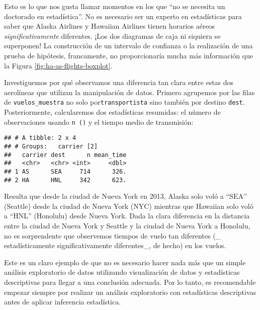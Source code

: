 \documentclass[
]{book}
\newenvironment{Shaded}{\begin{snugshade}}{\end{snugshade}}
\newcommand{\DataTypeTok}[1]{\textcolor[rgb]{0.13,0.29,0.53}{#1}}
\newcommand{\KeywordTok}[1]{\textcolor[rgb]{0.13,0.29,0.53}{\textbf{#1}}}
\newcommand{\NormalTok}[1]{#1}
\newcommand{\OperatorTok}[1]{\textcolor[rgb]{0.81,0.36,0.00}{\textbf{#1}}}
\newcommand{\OtherTok}[1]{\textcolor[rgb]{0.56,0.35,0.01}{#1}}
\newcommand{\StringTok}[1]{\textcolor[rgb]{0.31,0.60,0.02}{#1}}
\begin{document}
Esto es lo que nos gusta llamar momentos en los que ``no se necesita un doctorado en estadística''. No es necesario ser un experto en estadísticas para saber que Alaska Airlines y Hawaiian Airlines tienen horarios aéreos \emph{significativamente} diferentes. ¡Los dos diagramas de caja ni siquiera se superponen! La construcción de un intervalo de confianza o la realización de una prueba de hipótesis, francamente, no proporcionaría mucha más información que la Figura \ref{fig:ha-as-flights-boxplot}.

Investiguemos por qué observamos una diferencia tan clara entre estas dos aerolíneas que utilizan la manipulación de datos. Primero agrupemos por las filas de \texttt{vuelos\_muestra} no solo por\texttt{transportista} sino también por destino \texttt{dest}. Posteriormente, calcularemos dos estadísticas resumidas: el número de observaciones usando \texttt{n\ ()} y el tiempo medio de transmisión:

\begin{Shaded}
\end{Shaded}

\begin{verbatim}
## # A tibble: 2 x 4
## # Groups:   carrier [2]
##   carrier dest      n mean_time
##   <chr>   <chr> <int>     <dbl>
## 1 AS      SEA     714      326.
## 2 HA      HNL     342      623.
\end{verbatim}

Resulta que desde la ciudad de Nueva York en 2013, Alaska solo voló a ``SEA'' (Seattle) desde la ciudad de Nueva York (NYC) mientras que Hawaiian solo voló a ``HNL'' (Honolulu) desde Nueva York. Dada la clara diferencia en la distancia entre la ciudad de Nueva York y Seattle y la ciudad de Nueva York a Honolulu, no es sorprendente que observemos tiempos de vuelo tan diferentes (\_ estadísticamente significativamente diferentes\_, de hecho) en los vuelos.

Este es un claro ejemplo de que no es necesario hacer nada más que un simple análisis exploratorio de datos utilizando visualización de datos y estadísticas descriptivas para llegar a una conclusión adecuada. Por lo tanto, es recomendable empezar siempre por realizar un análisis exploratorio con estadísticas descriptivas antes de aplicar inferencia estadística.
\end{document}
